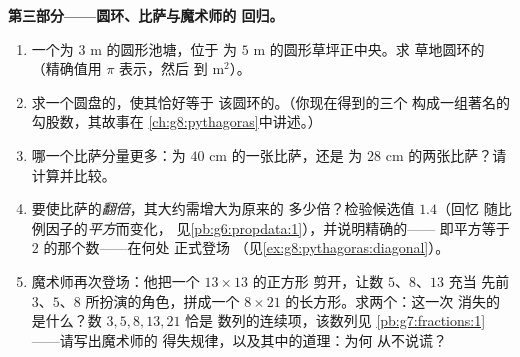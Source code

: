 \begin{problem}[{周末问题——一个著名的“证明”声称
$64 = 65$，借面积与斜率揭穿，
并以比萨与圆环作甜点}]
\medskip
\noindent\textbf{第三部分——圆环、比萨与魔术师的
回归。}
\begin{enumerate}[resume]
  \item 一个为 $3$ m 的圆形池塘，位于
        为 $5$ m 的圆形草坪正中央。求
        草地圆环的（精确值用 $\pi$ 表示，然后
        到 m$^2$）。
  \item 求一个圆盘的，使其恰好等于
        该圆环的。（你现在得到的三个
        构成一组著名的勾股数，其故事在
        \cref{ch:g8:pythagoras}中讲述。）
  \item 哪一个比萨分量更多：为 $40$ cm 的一张比萨，还是
        为 $28$ cm 的两张比萨？请计算并比较。
  \item 要使比萨的\emph{翻倍}，其大约需增大为原来的
        多少倍？检验候选值 $1.4$（回忆
        随比例因子的\emph{平方}而变化，
        见\cref{pb:g6:propdata:1}），并说明精确的——
        即平方等于 $2$ 的那个数——在何处
        正式登场
        （见\cref{ex:g8:pythagoras:diagonal}）。
  \item 魔术师再次登场：他把一个 $13 \times 13$ 的正方形
        剪开，让数 $5$、$8$、$13$ 充当
        先前 $3$、$5$、$8$ 所扮演的角色，拼成一个
        $8 \times 21$ 的长方形。求两个：这一次
        消失的是什么？数 $3, 5, 8, 13, 21$ 恰是
        数列的连续项，该数列见
        \cref{pb:g7:fractions:1}——请写出魔术师的
        得失规律，以及其中的道理：为何
        从不说谎？
\end{enumerate}
\end{problem}
